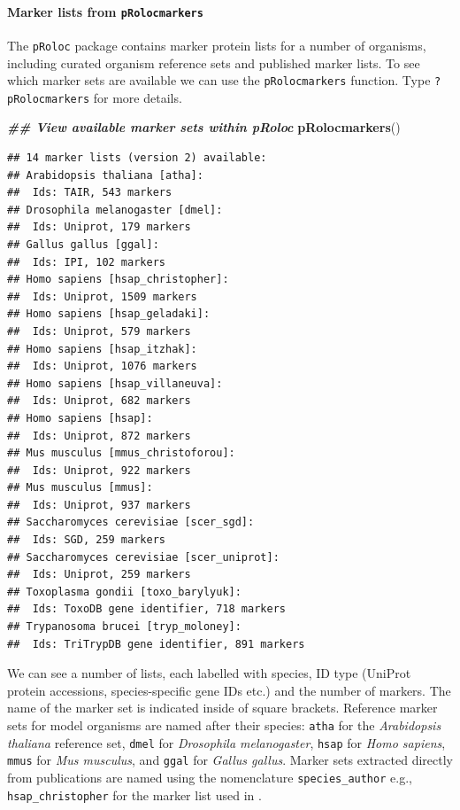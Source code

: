 \documentclass[9pt,a4paper,]{extarticle}
\newenvironment{Shaded}{\begin{snugshade}}{\end{snugshade}}
\newcommand{\DocumentationTok}[1]{\textcolor[rgb]{0.56,0.35,0.01}{\textbf{\textit{#1}}}}
\newcommand{\FunctionTok}[1]{\textcolor[rgb]{0.13,0.29,0.53}{\textbf{#1}}}
\newcommand{\NormalTok}[1]{#1}
\begin{document}
\paragraph{\texorpdfstring{Marker lists from \texttt{pRolocmarkers}}{Marker lists from pRolocmarkers}}\label{marker-lists-from-prolocmarkers}

The \texttt{pRoloc} package contains marker protein lists for a number of organisms,
including curated organism reference sets and published marker lists. To
see which marker sets are available we can use the \texttt{pRolocmarkers} function.
Type \texttt{?pRolocmarkers} for more details.

\begin{Shaded}
\begin{Highlighting}[]
\DocumentationTok{\#\# View available marker sets within pRoloc}
\FunctionTok{pRolocmarkers}\NormalTok{()}
\end{Highlighting}
\end{Shaded}

\begin{verbatim}
## 14 marker lists (version 2) available:
## Arabidopsis thaliana [atha]:
##  Ids: TAIR, 543 markers
## Drosophila melanogaster [dmel]:
##  Ids: Uniprot, 179 markers
## Gallus gallus [ggal]:
##  Ids: IPI, 102 markers
## Homo sapiens [hsap_christopher]:
##  Ids: Uniprot, 1509 markers
## Homo sapiens [hsap_geladaki]:
##  Ids: Uniprot, 579 markers
## Homo sapiens [hsap_itzhak]:
##  Ids: Uniprot, 1076 markers
## Homo sapiens [hsap_villaneuva]:
##  Ids: Uniprot, 682 markers
## Homo sapiens [hsap]:
##  Ids: Uniprot, 872 markers
## Mus musculus [mmus_christoforou]:
##  Ids: Uniprot, 922 markers
## Mus musculus [mmus]:
##  Ids: Uniprot, 937 markers
## Saccharomyces cerevisiae [scer_sgd]:
##  Ids: SGD, 259 markers
## Saccharomyces cerevisiae [scer_uniprot]:
##  Ids: Uniprot, 259 markers
## Toxoplasma gondii [toxo_barylyuk]:
##  Ids: ToxoDB gene identifier, 718 markers
## Trypanosoma brucei [tryp_moloney]:
##  Ids: TriTrypDB gene identifier, 891 markers
\end{verbatim}

We can see a number of lists, each labelled with species, ID type (UniProt
protein accessions, species-specific gene IDs etc.) and the number of markers.
The name of the marker set is indicated inside of square brackets. Reference
marker sets for model organisms are named after their species: \texttt{atha} for the
\emph{Arabidopsis thaliana} reference set, \texttt{dmel} for \emph{Drosophila melanogaster}, \texttt{hsap}
for \emph{Homo sapiens}, \texttt{mmus} for \emph{Mus musculus}, and \texttt{ggal} for \emph{Gallus gallus}.
Marker sets extracted directly from publications are named using the
nomenclature \texttt{species\_author} e.g., \texttt{hsap\_christopher} for the marker list used
in \citet{Christopher2025}.
\end{document}
